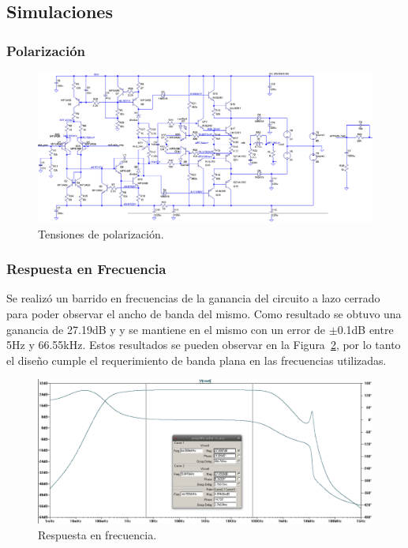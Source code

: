 \subsection{Simulaciones}
\bigskip
\subsubsection{Polarización}

\begin{figure}[H]
\centering
\centerline{
\includegraphics[width=\textwidth]{img/polarizacion.png}}
\caption{Tensiones de polarización.}
\label{polarizacion} 
\end{figure}
\medskip
\subsubsection{Respuesta en Frecuencia}

Se realizó un barrido en frecuencias de la ganancia del circuito a lazo cerrado para poder observar el ancho de banda del mismo. Como resultado se obtuvo una ganancia de 27.19dB y y se mantiene en el mismo con un error de $\pm$0.1dB entre 5Hz y 66.55kHz.
Estos resultados se pueden observar en la Figura~\ref{resp_frec}, por lo tanto el diseño cumple el requerimiento de banda plana en las frecuencias utilizadas. 

\begin{figure}[H]
\centering
\centerline{
\includegraphics[width=\textwidth]{img/ancho_de_banda.png}}
\caption{Respuesta en frecuencia.}
\label{resp_frec} 
\end{figure}

